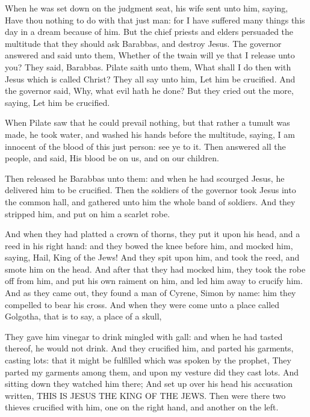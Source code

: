  When he was set down on the judgment seat, his wife sent
unto him, saying, Have thou nothing to do with that just man: for I have
suffered many things this day in a dream because of him. 
But the chief priests and elders persuaded the multitude that they
should ask Barabbas, and destroy Jesus.  The governor
answered and said unto them, Whether of the twain will ye that I release
unto you? They said, Barabbas.  Pilate saith unto them,
What shall I do then with Jesus which is called Christ? They all say
unto him, Let him be crucified.  And the governor said,
Why, what evil hath he done? But they cried out the more, saying, Let
him be crucified.

 When Pilate saw that he could prevail nothing, but that
rather a tumult was made, he took water, and washed his hands before the
multitude, saying, I am innocent of the blood of this just person: see
ye to it.  Then answered all the people, and said, His
blood be on us, and on our children.

 Then released he Barabbas unto them: and when he had
scourged Jesus, he delivered him to be crucified.  Then the
soldiers of the governor took Jesus into the common hall, and gathered
unto him the whole band of soldiers.  And they stripped
him, and put on him a scarlet robe.

 And when they had platted a crown of thorns, they put it
upon his head, and a reed in his right hand: and they bowed the knee
before him, and mocked him, saying, Hail, King of the Jews!
 And they spit upon him, and took the reed, and smote him
on the head.  And after that they had mocked him, they took
the robe off from him, and put his own raiment on him, and led him away
to crucify him.  And as they came out, they found a man of
Cyrene, Simon by name: him they compelled to bear his cross.
 And when they were come unto a place called Golgotha, that
is to say, a place of a skull,

 They gave him vinegar to drink mingled with gall: and
when he had tasted thereof, he would not drink.  And they
crucified him, and parted his garments, casting lots: that it might be
fulfilled which was spoken by the prophet, They parted my garments among
them, and upon my vesture did they cast lots.  And sitting
down they watched him there;  And set up over his head his
accusation written, THIS IS JESUS THE KING OF THE JEWS. 
Then were there two thieves crucified with him, one on the right hand,
and another on the left.

